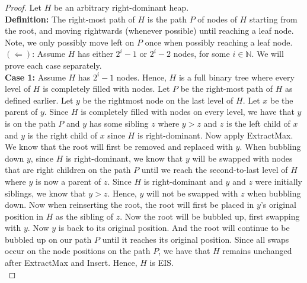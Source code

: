 \documentclass[12pt]{article}
\newcommand{\N}{\mathbb{N}}
\begin{document}
\begin{proof}
Let $H$ be an arbitrary right-dominant heap. \\

\textbf{Definition:} The right-most path of $H$ is the path $P$ of nodes of $H$ starting from the root, and moving rightwards (whenever possible) until reaching a leaf node. Note, we only possibly move left on $P$ once when possibly reaching a leaf node. \\

$(\Leftarrow)$: Assume $H$ has either $2^i - 1$ or $2^i - 2$ nodes, for some $i \in \N$. We will prove each case separately. \\

\textbf{Case 1:} Assume $H$ has $2^i - 1$ nodes. Hence, $H$ is a full binary tree where every level of $H$ is completely filled with nodes. Let $P$ be the right-most path of $H$ as defined earlier. Let $y$ be the rightmost node on the last level of $H$. Let $x$ be the parent of $y$. Since $H$ is completely filled with nodes on every level, we have that $y$ is on the path $P$ and $y$ has some sibling $z$ where $y > z$ and $z$ is the left child of $x$ and $y$ is the right child of $x$ since $H$ is right-dominant. Now apply ExtractMax. We know that the root will first be removed and replaced with $y$. When bubbling down $y$, since $H$ is right-dominant, we know that $y$ will be swapped with nodes that are right children on the path $P$ until we reach the second-to-last level of $H$ where $y$ is now a parent of $z$. Since $H$ is right-dominant and $y$ and $z$ were initially siblings, we know that $y > z$. Hence, $y$ will not be swapped with $z$ when bubbling down. Now when reinserting the root, the root will first be placed in $y$'s original position in $H$ as the sibling of $z$. Now the root will be bubbled up, first swapping with $y$. Now $y$ is back to its original position. And the root will continue to be bubbled up on our path $P$ until it reaches its original position. Since all swaps occur on the node positions on the path $P$, we have that $H$ remains unchanged after ExtractMax and Insert. Hence, $H$ is EIS. \\


\end{proof}
\end{document}
